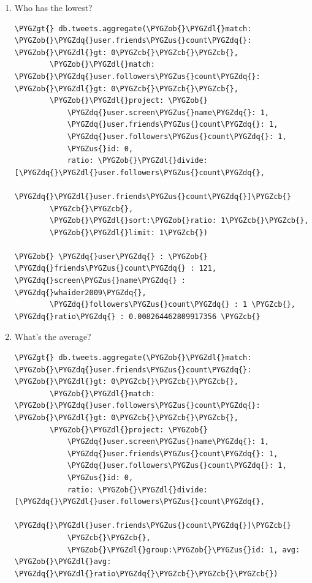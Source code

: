 \documentclass[a4paper,10pt,english]{sphinxmanual}
\def\PYGZus{\char`\_}
\def\PYGZob{\char`\{}
\def\PYGZcb{\char`\}}
\def\PYGZgt{\char`\>}
\def\PYGZdl{\char`\$}
\def\PYGZdq{\char`\"}
\begin{document}
\begin{itemize}
\begin{enumerate}
\item {} 
Who has the lowest?

\begin{Verbatim}[commandchars=\\\{\}]
\PYGZgt{} db.tweets.aggregate(\PYGZob{}\PYGZdl{}match: \PYGZob{}\PYGZdq{}user.friends\PYGZus{}count\PYGZdq{}: \PYGZob{}\PYGZdl{}gt: 0\PYGZcb{}\PYGZcb{}\PYGZcb{},
        \PYGZob{}\PYGZdl{}match: \PYGZob{}\PYGZdq{}user.followers\PYGZus{}count\PYGZdq{}: \PYGZob{}\PYGZdl{}gt: 0\PYGZcb{}\PYGZcb{}\PYGZcb{},
        \PYGZob{}\PYGZdl{}project: \PYGZob{}
            \PYGZdq{}user.screen\PYGZus{}name\PYGZdq{}: 1,
            \PYGZdq{}user.friends\PYGZus{}count\PYGZdq{}: 1,
            \PYGZdq{}user.followers\PYGZus{}count\PYGZdq{}: 1,
            \PYGZus{}id: 0,
            ratio: \PYGZob{}\PYGZdl{}divide:[\PYGZdq{}\PYGZdl{}user.followers\PYGZus{}count\PYGZdq{},
                             \PYGZdq{}\PYGZdl{}user.friends\PYGZus{}count\PYGZdq{}]\PYGZcb{}
        \PYGZcb{}\PYGZcb{},
        \PYGZob{}\PYGZdl{}sort:\PYGZob{}ratio: 1\PYGZcb{}\PYGZcb{},
        \PYGZob{}\PYGZdl{}limit: 1\PYGZcb{})

\PYGZob{} \PYGZdq{}user\PYGZdq{} : \PYGZob{} \PYGZdq{}friends\PYGZus{}count\PYGZdq{} : 121, \PYGZdq{}screen\PYGZus{}name\PYGZdq{} : \PYGZdq{}whaider2009\PYGZdq{},
        \PYGZdq{}followers\PYGZus{}count\PYGZdq{} : 1 \PYGZcb{}, \PYGZdq{}ratio\PYGZdq{} : 0.008264462809917356 \PYGZcb{}
\end{Verbatim}

\item {} 
What's the average?

\begin{Verbatim}[commandchars=\\\{\}]
\PYGZgt{} db.tweets.aggregate(\PYGZob{}\PYGZdl{}match: \PYGZob{}\PYGZdq{}user.friends\PYGZus{}count\PYGZdq{}: \PYGZob{}\PYGZdl{}gt: 0\PYGZcb{}\PYGZcb{}\PYGZcb{},
        \PYGZob{}\PYGZdl{}match: \PYGZob{}\PYGZdq{}user.followers\PYGZus{}count\PYGZdq{}: \PYGZob{}\PYGZdl{}gt: 0\PYGZcb{}\PYGZcb{}\PYGZcb{},
        \PYGZob{}\PYGZdl{}project: \PYGZob{}
            \PYGZdq{}user.screen\PYGZus{}name\PYGZdq{}: 1,
            \PYGZdq{}user.friends\PYGZus{}count\PYGZdq{}: 1,
            \PYGZdq{}user.followers\PYGZus{}count\PYGZdq{}: 1,
            \PYGZus{}id: 0,
            ratio: \PYGZob{}\PYGZdl{}divide:[\PYGZdq{}\PYGZdl{}user.followers\PYGZus{}count\PYGZdq{},
                             \PYGZdq{}\PYGZdl{}user.friends\PYGZus{}count\PYGZdq{}]\PYGZcb{}
            \PYGZcb{}\PYGZcb{},
            \PYGZob{}\PYGZdl{}group:\PYGZob{}\PYGZus{}id: 1, avg: \PYGZob{}\PYGZdl{}avg: \PYGZdq{}\PYGZdl{}ratio\PYGZdq{}\PYGZcb{}\PYGZcb{}\PYGZcb{})


\end{Verbatim}
\end{enumerate}
\end{itemize}
\end{document}
